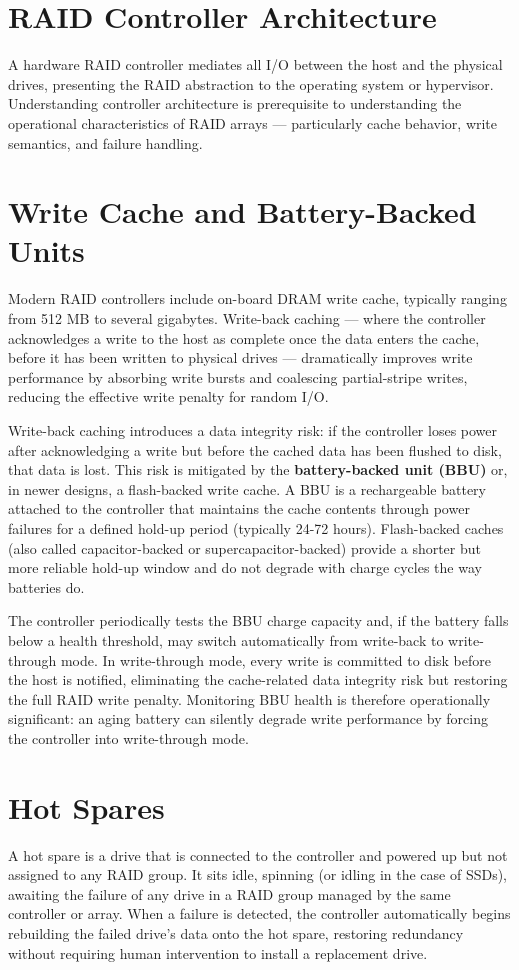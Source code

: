 \section{RAID Controller Architecture}
A hardware RAID controller mediates all I/O between the host and the physical drives, presenting the RAID abstraction to the operating system or hypervisor. Understanding controller architecture is prerequisite to understanding the operational characteristics of RAID arrays --- particularly cache behavior, write semantics, and failure handling.

\section{Write Cache and Battery-Backed Units}
Modern RAID controllers include on-board DRAM write cache, typically ranging from 512 MB to several gigabytes. Write-back caching --- where the controller acknowledges a write to the host as complete once the data enters the cache, before it has been written to physical drives --- dramatically improves write performance by absorbing write bursts and coalescing partial-stripe writes, reducing the effective write penalty for random I/O.

Write-back caching introduces a data integrity risk: if the controller loses power after acknowledging a write but before the cached data has been flushed to disk, that data is lost. This risk is mitigated by the \textbf{battery-backed unit (BBU)} or, in newer designs, a flash-backed write cache. A BBU is a rechargeable battery attached to the controller that maintains the cache contents through power failures for a defined hold-up period (typically 24-72 hours). Flash-backed caches (also called capacitor-backed or supercapacitor-backed) provide a shorter but more reliable hold-up window and do not degrade with charge cycles the way batteries do.

The controller periodically tests the BBU charge capacity and, if the battery falls below a health threshold, may switch automatically from write-back to write-through mode. In write-through mode, every write is committed to disk before the host is notified, eliminating the cache-related data integrity risk but restoring the full RAID write penalty. Monitoring BBU health is therefore operationally significant: an aging battery can silently degrade write performance by forcing the controller into write-through mode.

\section{Hot Spares}
A hot spare is a drive that is connected to the controller and powered up but not assigned to any RAID group. It sits idle, spinning (or idling in the case of SSDs), awaiting the failure of any drive in a RAID group managed by the same controller or array. When a failure is detected, the controller automatically begins rebuilding the failed drive's data onto the hot spare, restoring redundancy without requiring human intervention to install a replacement drive.

